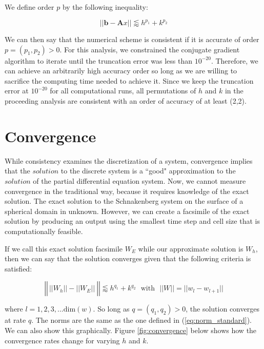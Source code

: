\documentclass[12pt]{article}
\begin{document}
We define order $p$ by the following inequality:

\begin{equation}
	||\textbf{b}-\textbf{A}x|| \lessapprox h^{p_1}+k^{p_2}
\end{equation}

We can then say that the numerical scheme is consistent if it is accurate of order $p=(p_1,p_2)>0$. For this analysis, we constrained the conjugate gradient algorithm to iterate until the truncation error was less than $10^{-20}$. Therefore, we can achieve an arbitrarily high accuracy order so long as we are willing to sacrifice the computing time needed to achieve it. Since we keep the truncation error at $10^{-20}$ for all computational runs, all permutations of $h$ and $k$ in the proceeding analysis are consistent with an order of accuracy of at least (2,2). 


\section{Convergence}

While consistency examines the discretization of a system, convergence implies that the $solution$ to the discrete system is a ``good" approximation to the $solution$ of the partial differential equation system. Now, we cannot measure convergence in the traditional way, because it requires knowledge of the exact solution. The exact solution to the Schnakenberg system on the surface of a spherical domain in unknown. However, we can create a facsimile of the exact solution by producing an output using the smallest time step and cell size that is computationally feasible. 

If we call this exact solution facsimile $W_E$ while our approximate solution is $W_h$, then we can say that the solution converges given that the following criteria is satisfied:

\begin{equation}
	\left|\left|\frac{}{} ||W_h|| - ||W_E|| ~\right|\right| \lessapprox h^{q_1} + k^{q_2} ~~~\text{with} ~~~ ||W|| = ||w_l-w_{l+1}||
\end{equation}

\noindent where $l=1,2,3,...\text{dim}(w)$. So long as $q=(q_1,q_2) > 0$, the solution converges at rate $q$. The norms are the same as the one defined in (\ref{eq:norm_standard}). We can also show this graphically. Figure \ref{fig:convergence} below shows how the convergence rates change for varying $h$ and $k$. 
\end{document}
